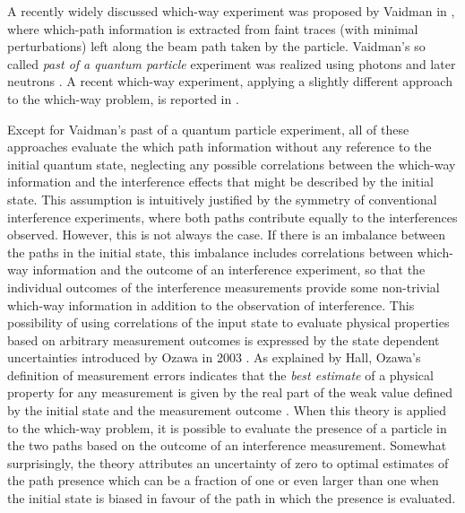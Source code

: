\documentclass[english,keywords,aps,twocolumn]{revtex4-1}
\begin{document}
A recently widely discussed which-way experiment was proposed by Vaidman in \cite{Vaidman13}, where which-path information is extracted from faint traces (with minimal perturbations) left along the beam path taken by the particle. Vaidman's so called \emph{past of a quantum particle} experiment was realized using photons \cite{Vaidman13} and later neutrons \cite{Geppert18}. A recent which-way experiment, applying a slightly different approach to the which-way problem, is reported in \cite{Fenghua20}. 

Except for Vaidman's past of a quantum particle experiment, all of these approaches evaluate the which path information without any reference to the initial quantum state, neglecting any possible correlations between the which-way information and the interference effects that might be described by the initial state.  This assumption is intuitively justified by the symmetry of conventional interference experiments, where both paths contribute equally to the interferences observed. However, this is not always the case. If there is an imbalance between the paths in the initial state, this imbalance includes correlations between which-way information and the outcome of an interference experiment, so that the individual outcomes of the interference measurements provide some non-trivial which-way information in addition to the observation of interference. This possibility of using correlations of the input state to evaluate physical properties based on arbitrary measurement outcomes is expressed by the state dependent uncertainties introduced by Ozawa in 2003 \cite{Ozawa03}. As explained by Hall, Ozawa's definition of measurement errors indicates that the \emph{best estimate} of a physical property for any measurement is given by the real part of the weak value defined by the initial state and the measurement outcome \cite{Hall04}. When this theory is applied to the which-way problem, it is possible to evaluate the presence of a particle in the two paths based on the outcome of an interference measurement. Somewhat surprisingly, the theory attributes an uncertainty of zero to optimal estimates of the path presence which can be a fraction of one or even larger than one when the initial state is biased in favour of the path in which the presence is evaluated.
\end{document}
